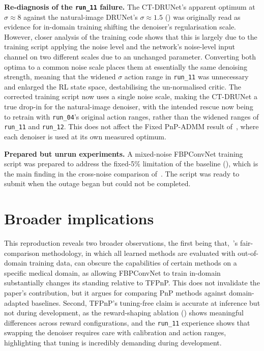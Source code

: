 \textbf{Re-diagnosis of the \texttt{run\_11} failure.} The CT-DRUNet's apparent optimum at $\sigma \approx 8$ against the natural-image DRUNet's $\sigma \approx 1.5$ () was originally read as evidence for in-domain training shifting the denoiser's regularisation scale. However, closer analysis of the training code shows that this is largely due to the training script applying the noise level and the network's noise-level input channel on two different scales due to an unchanged parameter. Converting both optima to a common noise scale places them at essentially the same denoising strength, meaning that the widened $\sigma$ action range in \texttt{run\_11} was unnecessary and enlarged the RL state space, destabilising the un-normalised critic. The corrected training script now uses a single noise scale, making the CT-DRUNet a true drop-in for the natural-image denoiser, with the intended rescue now being to retrain with \texttt{run\_04}'s original action ranges, rather than the widened ranges of \texttt{run\_11} and \texttt{run\_12}. This does not affect the Fixed PnP-ADMM result of~, where each denoiser is used at its own measured optimum.

\textbf{Prepared but unrun experiments.} A mixed-noise FBPConvNet training script was prepared to address the fixed-5\% limitation of the baseline (), which is the main finding in the cross-noise comparison of~. The script was ready to submit when the outage began but could not be completed. 

\section{Broader implications}
\label{sec:implications}

This reproduction reveals two broader observations, the first being that,~\citet{Wei2022TFPnP}'s fair-comparison methodology, in which all learned methods are evaluated with out-of-domain training data, can obscure the capabilities of certain methods on a specific medical domain, as allowing FBPConvNet to train in-domain substantially changes its standing relative to TFPnP. This does not invalidate the paper's contribution, but it argues for comparing PnP methods against domain-adapted baselines. Second, TFPnP's tuning-free claim is accurate at inference but not during development, as the reward-shaping ablation () shows meaningful differences across reward configurations, and the \texttt{run\_11} experience shows that swapping the denoiser requires care with calibration and action ranges, highlighting that tuning is incredibly demanding during development.